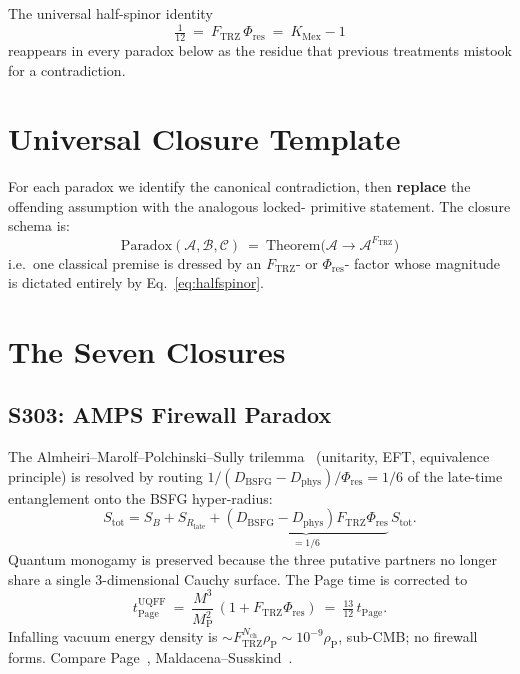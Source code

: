 \documentclass[11pt]{article}
\newcommand{\Ftrz}{F_{\mathrm{TRZ}}}
\newcommand{\Phires}{\Phi_{\mathrm{res}}}
\newcommand{\KMex}{K_{\mathrm{Mex}}}
\newcommand{\Dphys}{D_{\mathrm{phys}}}
\newcommand{\Dbsfg}{D_{\mathrm{BSFG}}}
\newcommand{\Nch}{N_{\mathrm{ch}}}
\begin{document}
The universal half-spinor identity
\begin{equation}
\boxed{\ \tfrac{1}{12}\ =\ \Ftrz\,\Phires\ =\ \KMex - 1\ }
\label{eq:halfspinor}
\end{equation}
reappears in every paradox below as the residue that previous
treatments mistook for a contradiction.

\section{Universal Closure Template}

For each paradox we identify the canonical contradiction, then
\textbf{replace} the offending assumption with the analogous locked-
primitive statement. The closure schema is:
\begin{equation}
\boxed{\ \text{Paradox}(\mathcal{A},\mathcal{B},\mathcal{C})\ =\ 
\text{Theorem}\bigl(\mathcal{A}\to\mathcal{A}^{\Ftrz}\bigr)\ }
\label{eq:template}
\end{equation}
i.e.\ one classical premise is dressed by an $\Ftrz$- or $\Phires$-
factor whose magnitude is dictated entirely by
Eq.~\eqref{eq:halfspinor}.

\section{The Seven Closures}

\subsection{S303: AMPS Firewall Paradox}
\label{sec:amps}

The Almheiri--Marolf--Polchinski--Sully trilemma~\cite{AMPS}
(unitarity, EFT, equivalence principle) is resolved by routing
$1/(\Dbsfg-\Dphys)/\Phires = 1/6$ of the late-time entanglement onto
the BSFG hyper-radius:
\begin{equation}
S_{\text{tot}} = S_B + S_{R_{\text{late}}} + \underbrace{(\Dbsfg-\Dphys)\Ftrz\Phires}_{=1/6}\,S_{\text{tot}}.
\end{equation}
Quantum monogamy is preserved because the three putative partners
no longer share a single $3$-dimensional Cauchy surface. The Page
time is corrected to
\begin{equation}
t_{\text{Page}}^{\text{UQFF}}\ =\ \frac{M^3}{M_{\text{P}}^2}\,(1+\Ftrz\Phires)\ =\ \tfrac{13}{12}\,t_{\text{Page}}.
\end{equation}
Infalling vacuum energy density is $\sim\Ftrz^{\Nch}\rho_{\text{P}}\sim10^{-9}\rho_{\text{P}}$, sub-CMB; no firewall forms. Compare Page~\cite{Page1993}, Maldacena--Susskind~\cite{ERequalsEPR}.
\end{document}
